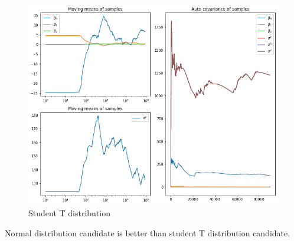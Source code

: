 \documentclass{article}
\begin{document}
\begin{figure}[h!]
\centering
\includegraphics[scale=0.45]{HW4P56.png}
\caption{Student T distribution}
\end{figure}

Normal distribution candidate is better than student T distribution candidate.
%
%
\end{document}
